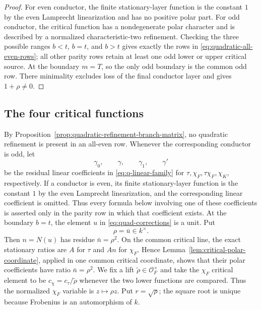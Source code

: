 \documentclass[11pt]{amsart}
\theoremstyle{definition}
\theoremstyle{remark}
\newcommand{\cO}{\mathcal O}
\begin{document}
\begin{proof}
For even conductor, the finite stationary-layer function is the constant
$1$ by the even Lamprecht linearization and has no positive polar part.
For odd conductor, the critical function has a nondegenerate polar
character and is described by a normalized characteristic-two
refinement.  Checking the three possible ranges $b<t$, $b=t$, and
$b>t$ gives exactly the rows in
\eqref{eq:quadratic-all-even-rows}; all other parity rows retain at least
one odd lower or upper critical source.  At the boundary $m=T$, so the
only odd boundary is the common odd row.  There minimality excludes loss
of the final conductor layer and gives $1+\rho\ne0$.
\end{proof}

\subsection{The four critical functions}

By Proposition~\ref{prop:quadratic-refinement-branch-matrix}, no
quadratic refinement is present in an all-even row.  Whenever the
corresponding conductor is odd, let
\[
 \gamma_0,\qquad \gamma,\qquad \gamma_1,\qquad \gamma'
\]
be the residual linear coefficients in \eqref{eq:q-linear-family} for
$\tau,\chi_F,\tau\chi_F,\chi_K$, respectively.  If a conductor is
even, its finite stationary-layer function is the constant $1$ by the
even Lamprecht linearization, and the corresponding linear coefficient
is omitted.  Thus every formula below involving one of these
coefficients is asserted only in the parity row in which that
coefficient exists.  At the boundary
$b=t$, the element $u$ in \eqref{eq:quad-corrections} is a unit.  Put
\begin{equation}\label{eq:quadratic-rho-definition}
 \rho=\bar u\in k^\times.
\end{equation}
Then $n=N(u)$ has residue $\bar n=\rho^2$.  On the common
critical line, the exact stationary ratios are $A$ for $\tau$ and
$An$ for $\chi_F$.  Hence
Lemma~\ref{lem:critical-polar-coordinate}, applied in one common
critical coordinate, shows that their polar coefficients have ratio
$\bar n=\rho^2$.  We fix a lift $\widetilde\rho\in\cO_F^\times$
and take the $\chi_F$ critical element to be
$c_\chi=c_\tau/\widetilde\rho$ whenever the two lower functions
are compared.  Thus the normalized
$\chi_F$ variable is $z\mapsto\rho z$.  Put $r=\sqrt\rho$; the square
root is unique because Frobenius is an automorphism of $k$.
\end{document}
